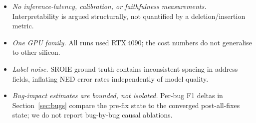 \begin{itemize}
{        The learned-vs-rule-based $\Delta$ (basic-variant only,
        Section~\ref{sec:results}) is reported as a single number and
        not further decomposed into per-component contributions.}
  \item \emph{No inference-latency, calibration, or faithfulness
        measurements.}  Interpretability is argued structurally,
        not quantified by a deletion/insertion metric.
  \item \emph{One GPU family.}  All runs used RTX\,4090;
        the cost numbers do not generalise to other silicon.
  \item \emph{Label noise.}  SROIE ground truth contains
        inconsistent spacing in address fields, inflating NED
        error rates independently of model quality.
  \item \emph{Bug-impact estimates are bounded, not isolated.}
        Per-bug F1 deltas in Section~\ref{sec:bugs} compare the
        pre-fix state to the converged post-all-fixes state; we do
        not report bug-by-bug causal ablations.
\end{itemize}
